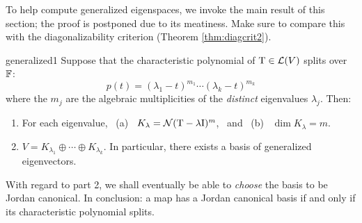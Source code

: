 \pagebreak[3]


To  help compute generalized eigenspaces, we invoke the main result of this section; the proof is postponed due to its meatiness. Make sure to compare this with the diagonalizability criterion (Theorem \ref{thm:diagcrit2}).

\begin{thm}{}{generalized1}
	Suppose that the characteristic polynomial of $\mathrm{T}\in\mathcal{L}(V)$ splits over $\mathbb{F}$:
	\[
		p(t)=(\lambda_1-t)^{m_1}\cdots (\lambda_k-t)^{m_k}
	\]
	where the $m_j$ are the algebraic multiplicities of the \emph{distinct} eigenvalues $\lambda_j$. Then:
	\begin{enumerate}\itemsep0pt
	  \item For each eigenvalue, \ (a) \ $K_{\lambda}=\mathcal{N}(\mathrm{T}-\lambda \mathrm{I})^{m}$, \ and \ (b) \ $\dim K_{\lambda}=m$.
		\item $V=K_{\lambda_1}\oplus\cdots\oplus K_{\lambda_k}$. In particular, there exists a basis of generalized eigenvectors.
	\end{enumerate}
\end{thm}

With regard to part 2, we shall eventually be able to \emph{choose} the basis to be Jordan canonical. In conclusion: a map has a Jordan canonical basis if and only if its characteristic polynomial splits.



